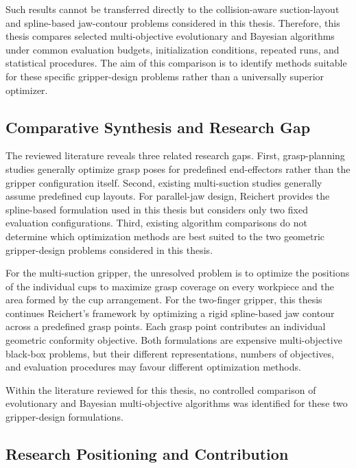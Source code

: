 Such results cannot be transferred directly to the collision-aware suction-layout and spline-based jaw-contour problems considered in this thesis.
Therefore, this thesis compares selected multi-objective evolutionary and Bayesian algorithms under common evaluation budgets, initialization
conditions, repeated runs, and statistical procedures. The aim of this comparison is to identify methods suitable for these specific gripper-design
problems rather than a universally superior optimizer.

\subsection{Comparative Synthesis and Research Gap}
\label{subsec:research_gap}

The reviewed literature reveals three related research gaps. First, grasp-planning studies generally optimize grasp poses for predefined end-effectors
rather than the gripper configuration itself. Second, existing multi-suction studies generally assume predefined cup layouts. For parallel-jaw
design, Reichert \cite{reichert2024greiferoptimierung} provides the spline-based formulation used in this thesis but considers only
two fixed evaluation configurations. Third, existing algorithm comparisons do not determine which optimization methods are best
suited to the two geometric gripper-design problems considered in this thesis.

For the multi-suction gripper, the unresolved problem is to optimize the positions of the individual cups to maximize grasp coverage on every
workpiece and the area formed by the cup arrangement. For the two-finger gripper, this thesis continues Reichert's framework by optimizing a rigid
spline-based jaw contour across a predefined grasp points. Each grasp point contributes an individual geometric conformity objective. Both
formulations are expensive multi-objective black-box problems, but their different representations, numbers of objectives, and evaluation procedures
may favour different optimization methods.

Within the literature reviewed for this thesis, no controlled comparison of evolutionary and Bayesian multi-objective algorithms was identified for
these two gripper-design formulations.

\subsection{Research Positioning and Contribution}
\label{subsec:research_positioning}

